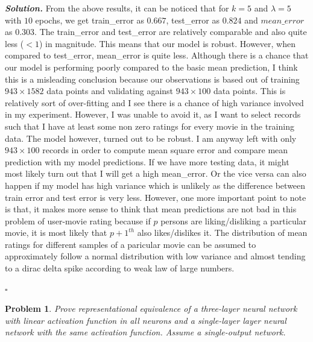 \documentclass[10pt]{article}
\newtheorem{problem}{Problem}
\newenvironment{solution}[1][\it{Solution}]{\textbf{#1. } }{$\square$}
\begin{document}
\begin{solution}
From the above results, it can be noticed that for $k = 5$ and $\lambda = 5$ with $10$ epochs, we get train\_error as $0.667$, test\_error as $0.824$ and $mean\_error$ as $0.303$. The train\_error and test\_error are relatively comparable and also quite less ($< 1$) in magnitude. This means that our model is robust. However, when compared to test\_error, mean\_error is quite less. Although there is a chance that our model is performing poorly compared to the basic mean prediction, I think this is a misleading conclusion because our observations is based out of training $943 \times 1582$ data points and validating against $943 \times 100$ data points. This is relatively sort of over-fitting and I see there is a chance of high variance involved in my experiment. However, I was unable to avoid it, as I want to select records such that I have at least some non zero ratings for every movie in the training data. The model however, turned out to be robust. I am anyway left with only $943 \times 100$ records in order to compute mean square error and compare mean prediction with my model predictions. If we have more testing data, it might most likely turn out that I will get a high mean\_error. Or the vice versa can also happen if my model has high variance which is unlikely as the difference between train error and test error is very less. However, one more important point to note is that, it makes more sense to think that mean predictions are not bad in this problem of user-movie rating because if $p$ persons are liking/disliking a particular movie, it is most likely that $p + 1^{th}$ also likes/dislikes it. The distribution of mean ratings for different samples of a paricular movie can be assumed to approximately follow a normal distribution with low variance and almost tending to a dirac delta spike according to weak law of large numbers\cite{lln}.


\end{solution}


\begin{problem}
Prove representational equivalence of a three-layer neural network with linear activation function in all neurons and a single-layer layer neural network with the same activation function. Assume a single-output network.
\end{problem}
\end{document}
